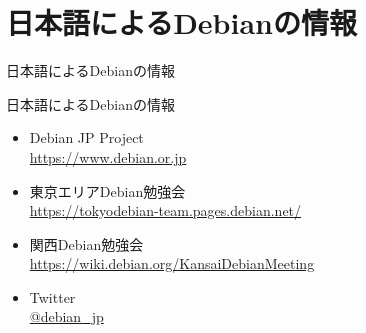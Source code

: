 





\section{日本語によるDebianの情報}

\begin{frame}\begin{center}\Huge{日本語によるDebianの情報}\end{center}\end{frame}

\begin{frame}{日本語によるDebianの情報}
\begin{itemize}
  \item Debian JP Project \\
      \url{https://www.debian.or.jp}
  \item 東京エリアDebian勉強会\\
      \url{https://tokyodebian-team.pages.debian.net/}
  \item 関西Debian勉強会 \\
      \url{https://wiki.debian.org/KansaiDebianMeeting}
  \item Twitter \\
      \url{@debian_jp}
\end{itemize}
\end{frame}


%



